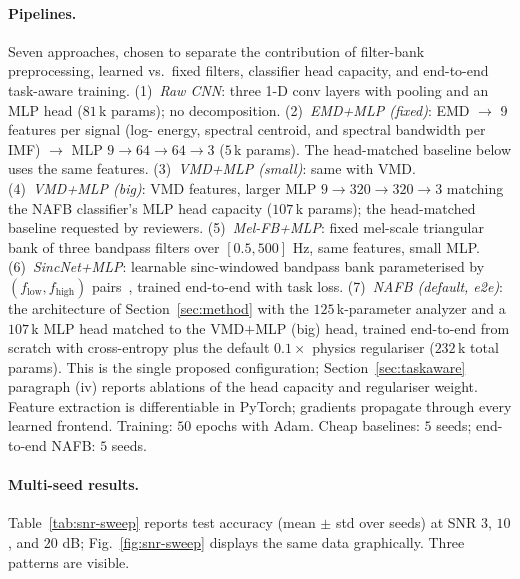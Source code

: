 \documentclass[journal]{IEEEtran}
\theoremstyle{remark}
\begin{document}
\paragraph{Pipelines.}
Seven approaches, chosen to separate the contribution of filter-bank
preprocessing, learned vs.\ fixed filters, classifier head capacity,
and end-to-end task-aware training. (1)~\emph{Raw CNN}: three 1-D
conv layers with pooling and an MLP head ($81$\,k params); no
decomposition. (2)~\emph{EMD+MLP (fixed)}: EMD $\to$ 9 features per signal (log-
energy, spectral centroid, and spectral bandwidth per IMF) $\to$ MLP
$9{\to}64{\to}64{\to}3$ ($5$\,k params). The head-matched baseline
below uses the same features. (3)~\emph{VMD+MLP (small)}: same with
VMD. (4)~\emph{VMD+MLP (big)}: VMD features, larger MLP
$9{\to}320{\to}320{\to}3$ matching the NAFB classifier's
MLP head capacity ($107$\,k params); the head-matched baseline
requested by reviewers.
(5)~\emph{Mel-FB+MLP}: fixed mel-scale triangular bank of three
bandpass filters over $[0.5, 500]$ Hz, same features, small MLP.
(6)~\emph{SincNet+MLP}: learnable sinc-windowed bandpass bank
parameterised by $(f_{\text{low}}, f_{\text{high}})$
pairs~\cite{ravanelli2018sincnet}, trained end-to-end with task loss.
(7)~\emph{NAFB (default, e2e)}: the architecture of
Section~\ref{sec:method} with the $125$\,k-parameter analyzer and a
$107$\,k MLP head matched to the VMD$+$MLP (big) head, trained
end-to-end from scratch with cross-entropy plus the default
$0.1{\times}$ physics regulariser ($232$\,k total params). This is the
single proposed configuration; Section~\ref{sec:taskaware} paragraph
(iv) reports ablations of the head capacity and regulariser weight.
Feature extraction is differentiable in PyTorch; gradients propagate
through every learned frontend. Training: $50$ epochs with Adam. Cheap
baselines: $5$ seeds; end-to-end NAFB: $5$ seeds.

\paragraph{Multi-seed results.}
Table~\ref{tab:snr-sweep} reports test accuracy (mean $\pm$ std over
seeds) at SNR $3$, $10$, and $20$ dB; Fig.~\ref{fig:snr-sweep}
displays the same data graphically. Three patterns are visible.
\end{document}
